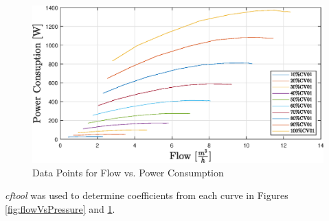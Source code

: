 \begin{figure}[ht]
	\centering
	\includegraphics[width=1\textwidth]{figures/05mathematicalModelling/flowVsPowerRun34.eps}
	\caption{Data Points for Flow vs. Power Consumption}
	\label{fig:flowVsPowerConsumption}
\end{figure}

\textit{cftool} was used to determine coefficients  from each curve in  Figures \ref{fig:flowVsPressure}
and \ref{fig:flowVsPowerConsumption}.




